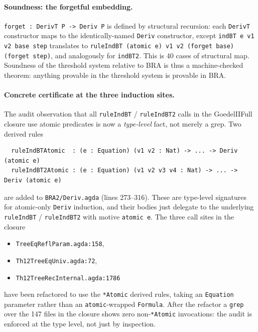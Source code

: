 \documentclass[11pt]{article}
\begin{document}
\paragraph{Soundness: the forgetful embedding.}
\verb|forget : DerivT P -> Deriv P| is defined by structural
recursion: each \verb|DerivT| constructor maps to the
identically-named \verb|Deriv| constructor, except
\verb|indBT e v1 v2 base step| translates to
\verb|ruleIndBT (atomic e) v1 v2 (forget base) (forget step)|, and
analogously for \verb|indBT2|.  This is 40 cases of structural map.
Soundness of the threshold system relative to BRA is thus a
machine-checked theorem: anything provable in the threshold system
is provable in BRA.

\paragraph{Concrete certificate at the three induction sites.}
The audit observation that all \verb|ruleIndBT| / \verb|ruleIndBT2|
calls in the GoedelIIFull closure use atomic predicates is now a
\emph{type-level} fact, not merely a grep.  Two derived rules
\begin{verbatim}
  ruleIndBTAtomic  : (e : Equation) (v1 v2 : Nat) -> ... -> Deriv (atomic e)
  ruleIndBT2Atomic : (e : Equation) (v1 v2 v3 v4 : Nat) -> ... -> Deriv (atomic e)
\end{verbatim}
are added to \verb|BRA2/Deriv.agda| (lines 273--316).  These are
type-level signatures for atomic-only \verb|Deriv| induction, and
their bodies just delegate to the underlying \verb|ruleIndBT| /
\verb|ruleIndBT2| with motive \verb|atomic e|.  The three call sites
in the closure
\begin{itemize}
  \item \verb|TreeEqReflParam.agda:158|,
  \item \verb|Th12TreeEqUniv.agda:72|,
  \item \verb|Th12TreeRecInternal.agda:1786|
\end{itemize}
have been refactored to use the \verb|*Atomic| derived rules, taking
an \verb|Equation| parameter rather than an \verb|atomic|-wrapped
\verb|Formula|.  After the refactor a \verb|grep| over the 147 files
in the closure shows zero non-\verb|*Atomic| invocations: the audit
is enforced at the type level, not just by inspection.
\end{document}
